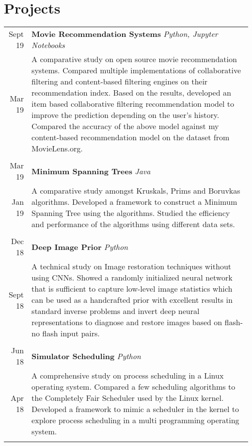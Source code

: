 \documentclass[article,10pt]{article}
\begin{document}
\section{Projects}
\begin{tabular}{r|p{17cm}}
Sept \textquotesingle{}19 & \textbf{Movie Recommendation Systems} \sl{Python, Jupyter Notebooks} \\
Mar \textquotesingle{}19 & \footnotesize{A comparative study on open source movie recommendation systems. Compared multiple implementations of collaborative filtering and content-based filtering engines on their recommendation index. Based on the results, developed an item based collaborative filtering recommendation model to improve the prediction depending on the user’s history. Compared the accuracy of the above model against my content-based recommendation model on the dataset from MovieLens.org.}\\ \multicolumn{2}{c}{}\\

Mar \textquotesingle{}19 & \textbf{Minimum Spanning Trees} \sl{Java} \\
Jan \textquotesingle{}19 & \footnotesize{A comparative study amongst Kruskal\textquotesingle{}s, Prim\textquotesingle{}s and Boruvka\textquotesingle{}s algorithms. Developed a framework to construct a Minimum Spanning Tree using the algorithms. Studied the efficiency and performance of the algorithms using different data sets.}\\ \multicolumn{2}{c}{} \\

Dec \textquotesingle{}18 & \textbf{Deep Image Prior} \sl{Python} \\ 
Sept \textquotesingle{}18 & \footnotesize{A technical study on Image restoration techniques without using CNN\textquotesingle{}s. Showed a randomly initialized neural network that is sufficient to capture low-level image statistics which can be used as a handcrafted prior with excellent results in standard inverse problems and invert deep neural representations to diagnose and restore images based on flash-no flash input pairs.}\\\multicolumn{2}{c}{}\\

Jun \textquotesingle{}18 & \textbf{Simulator Scheduling} \sl{Python} \\
Apr \textquotesingle{}18 & \footnotesize{A comprehensive study on process scheduling in a Linux operating system. Compared a few scheduling algorithms to the Completely Fair Scheduler used by the Linux kernel. Developed a framework to mimic a scheduler in the kernel to explore process scheduling in a multi programming operating system. }\\ \multicolumn{2}{c}{} \\


\end{tabular}
\end{document}
